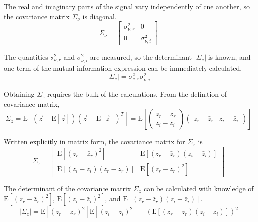\documentclass{article}         %
\theoremstyle{definition}
\theoremstyle{remark}
\begin{document}
The real and imaginary parts of the signal vary independently of one another, so the covariance matrix $\Sigma_\nu$ is diagonal.
\begin{equation}
	\Sigma_\nu = \left[ \begin{array}{cc}
	\sigma_{\nu,r}^2 & 0 \\
	0 & \sigma_{\nu,i}^2 \end{array} \right]
\end{equation}

The quantities $\sigma_{\nu,r}^2$ and $\sigma_{\nu,i}^2$ are measured, so the determinant $\lvert\Sigma_\nu\rvert$ is known, and one term of the mutual information expression can be immediately calculated.
\begin{equation}
	\lvert\Sigma_\nu\rvert = \sigma_{\nu,r}^2\sigma_{\nu,i}^2
\end{equation}

Obtaining $\Sigma_z$ requires the bulk of the calculations. From the definition of covariance matrix, 
\begin{equation}
	\Sigma_z = \mathrm{E}\left[\left(\vec{z} - \mathrm{E}\left[\vec{z}\right]\right)\left(\vec{z} - \mathrm{E}\left[\vec{z}\right]\right)^T\right] 
	= \mathrm{E}\left[\left( \begin{array}{c}
	z_r - \bar{z}_r \\
	z_i - \bar{z}_i \end{array} \right)\left( \begin{array}{cc}
	z_r - \bar{z}_r & z_i - \bar{z}_i \end{array} \right)\right]
\end{equation}

Written explicitly in matrix form, the covariance matrix for $\Sigma_z$ is
\begin{equation}
	\Sigma_z = \left[ \begin{array}{cc}
	\mathrm{E}\left[\left(z_r - \bar{z}_r\right)^2\right] & \mathrm{E}\left[\left(z_r - \bar{z}_r\right)\left(z_i - \bar{z}_i\right)\right] \\
	\mathrm{E}\left[\left(z_i - \bar{z}_i\right)\left(z_r - \bar{z}_r\right)\right] & \mathrm{E}\left[\left(z_r - \bar{z}_r\right)^2\right] \end{array} \right]
\end{equation}

The determinant of the covariance matrix $\Sigma_z$ can be calculated with knowledge of $\mathrm{E}\left[\left(z_r - \bar{z}_r\right)^2\right]$, $\mathrm{E}\left[\left(z_i - \bar{z}_i\right)^2\right]$, and $\mathrm{E}\left[\left(z_r - \bar{z}_r\right)\left(z_i - \bar{z}_i\right)\right]$.
\begin{equation}
	\lvert\Sigma_z\rvert = \mathrm{E}\left[\left(z_r - \bar{z}_r\right)^2\right]\mathrm{E}\left[\left(z_i - \bar{z}_i\right)^2\right] - \left(\mathrm{E}\left[\left(z_r - \bar{z}_r\right)\left(z_i - \bar{z}_i\right)\right]\right)^2
\end{equation}
\end{document}
